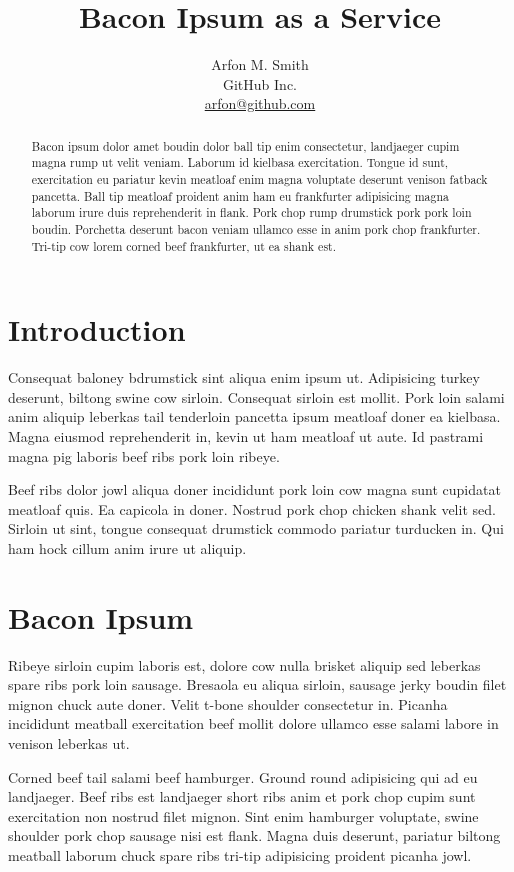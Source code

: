 \documentclass[a4paper,10pt]{article}
\title{Bacon Ipsum as a Service \vspace{-0.2cm}}
\author{
Arfon M. Smith\\
GitHub Inc.\\
\url{arfon@github.com}
}
\date{}
\begin{document}
\maketitle

\vspace{-1.2cm}
\begin{abstract}

\noindent
Bacon ipsum dolor amet boudin dolor ball tip enim consectetur, landjaeger cupim magna rump ut velit veniam. Laborum id kielbasa exercitation. Tongue id sunt, exercitation eu pariatur kevin meatloaf enim magna voluptate deserunt venison fatback pancetta. Ball tip meatloaf proident anim ham eu frankfurter adipisicing magna laborum irure duis reprehenderit in flank. Pork chop rump drumstick pork pork loin boudin. Porchetta deserunt bacon veniam ullamco esse in anim pork chop frankfurter. Tri-tip cow lorem corned beef frankfurter, ut ea shank est.
\end{abstract}

\section{Introduction}

Consequat baloney bdrumstick sint aliqua enim ipsum ut. Adipisicing turkey deserunt, biltong swine cow sirloin. Consequat sirloin est mollit. Pork loin salami anim aliquip leberkas tail tenderloin pancetta ipsum meatloaf doner ea kielbasa. Magna eiusmod reprehenderit in, kevin ut ham meatloaf ut aute. Id pastrami magna pig laboris beef ribs pork loin ribeye.

Beef ribs dolor jowl aliqua doner incididunt pork loin cow magna sunt cupidatat meatloaf quis. Ea capicola in doner. Nostrud pork chop chicken shank velit sed. Sirloin ut sint, tongue consequat drumstick commodo pariatur turducken in. Qui ham hock cillum anim irure ut aliquip.

\section{Bacon Ipsum}

Ribeye sirloin cupim laboris est, dolore cow nulla brisket aliquip sed leberkas spare ribs pork loin sausage. Bresaola eu aliqua sirloin, sausage jerky boudin filet mignon chuck aute doner. Velit t-bone shoulder consectetur in. Picanha incididunt meatball exercitation beef mollit dolore ullamco esse salami labore in venison leberkas ut.

Corned beef tail salami beef hamburger. Ground round adipisicing qui ad eu landjaeger. Beef ribs est landjaeger short ribs anim et pork chop cupim sunt exercitation non nostrud filet mignon. Sint enim hamburger voluptate, swine shoulder pork chop sausage nisi est flank. Magna duis deserunt, pariatur biltong meatball laborum chuck spare ribs tri-tip adipisicing proident picanha jowl.
\end{document}
